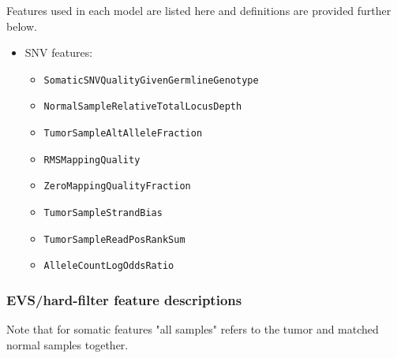 \documentclass{article}
\begin{document}
Features used in each model are listed here and definitions are provided further below.

\begin{itemize}
    \item SNV features:
    \begin{itemize}
        \item \texttt{SomaticSNVQualityGivenGermlineGenotype}
        \item \texttt{NormalSampleRelativeTotalLocusDepth}
        \item \texttt{TumorSampleAltAlleleFraction}
        \item \texttt{RMSMappingQuality}
        \item \texttt{ZeroMappingQualityFraction}
        \item \texttt{TumorSampleStrandBias}
        \item \texttt{TumorSampleReadPosRankSum}
        \item \texttt{AlleleCountLogOddsRatio}
    \end{itemize}
\end{itemize}

\subsubsection{EVS/hard-filter feature descriptions}

Note that for somatic features "all samples" refers to the tumor and matched normal samples together.
\end{document}
